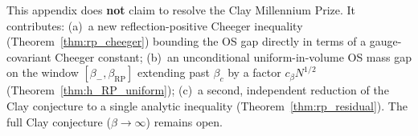 \begin{remark}
\label{rem:rp_honest_status}
This appendix does \textbf{not} claim to resolve the Clay Millennium
Prize. It contributes:
(a)~a new reflection-positive Cheeger inequality
(Theorem~\ref{thm:rp_cheeger}) bounding the OS gap directly in terms
of a gauge-covariant Cheeger constant;
(b)~an unconditional uniform-in-volume OS mass gap on the window
$[\beta_{-},\beta_{\mathrm{RP}}]$ extending past $\beta_{c}$ by a
factor $c_{\beta}N^{1/2}$ (Theorem~\ref{thm:h_RP_uniform});
(c)~a second, independent reduction of the Clay conjecture to a
single analytic inequality (Theorem~\ref{thm:rp_residual}).
The full Clay conjecture ($\beta\to\infty$) remains open.
\end{remark}

\endinput
